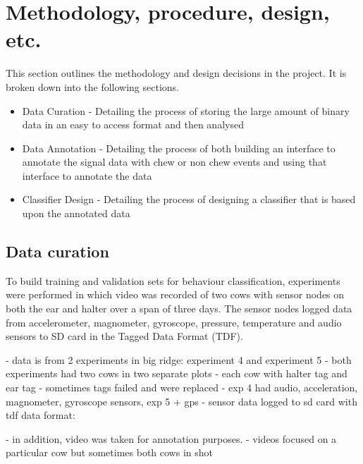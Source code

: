 \chapter{Methodology, procedure, design, etc.}

This section outlines the methodology and design decisions in the project. It is broken down into the following sections. 

\begin{itemize}
\item Data Curation - Detailing the process of storing the large amount of binary data in an easy to access format and then analysed

\item Data Annotation - Detailing the process of both building an interface to annotate the signal data with chew or non chew events and using that interface to annotate the data

\item Classifier Design - Detailing the process of designing a classifier that is based upon the annotated data
\end{itemize}

\section{Data curation}

To build training and validation sets for behaviour classification, experiments were performed in which video was recorded of two cows with sensor nodes on both the ear and halter over a span of three days. The sensor nodes logged data from accelerometer, magnometer, gyroscope, pressure, temperature and audio sensors to SD card in the Tagged Data Format (TDF). 

- data is from 2 experiments in big ridge: experiment 4 and experiment 5
	- both experiments had two cows in two separate plots
		- each cow with halter tag and ear tag	
		- sometimes tags failed and were replaced	
	- exp 4 had audio, acceleration, magnometer, gyroscope sensors, exp 5 + gps	
	- sensor data logged to sd card with tdf data format: %
	
- in addition, video was taken for annotation purposes.
	- videos focused on a particular cow but sometimes both cows in shot

